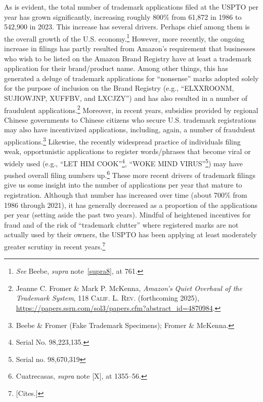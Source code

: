 \documentclass[letterpaper, 11pt, oneside]{article}
\begin{document}
As is evident, the total number of trademark applications filed at the USPTO per year has grown significantly, increasing roughly 800\% from 61,872 in 1986 to 542,900 in 2023. This increase has several drivers. Perhaps chief among them is the overall growth of the U.S. economy.\footnote{\textit{See} Beebe, \textit{supra} note~\ref{supra8}, at 761.} However, more recently, the ongoing increase in filings has partly resulted from Amazon's requirement that businesses who wish to be listed on the Amazon Brand Registry have at least a trademark application for their brand/product name. Among other things, this has generated a deluge of trademark applications for ``nonsense'' marks adopted solely for the purpose of inclusion on the Brand Registry (e.g., ``ELXXROONM, SUJIOWJNP, XUFFBV, and LXCJZY'') and has also resulted in a number of fraudulent applications.\footnote{Jeanne C. Fromer \& Mark P. McKenna, \textit{Amazon's Quiet Overhaul of the Trademark System}, 118 \textsc{Calif. L. Rev.} (forthcoming 2025), \url{https://papers.ssrn.com/sol3/papers.cfm?abstract_id=4870984}.} Moreover, in recent years, subsidies provided by regional Chinese governments to Chinese citizens who secure U.S. trademark registrations may also have incentivized applications, including, again, a number of fraudulent applications.\footnote{Beebe \& Fromer (Fake Trademark Specimens); Fromer \& McKenna.} Likewise, the recently widespread practice of individuals filing weak, opportunistic applications to register words/phrases that become viral or widely used (e.g., ``LET HIM COOK''\footnote{Serial No. 98,223,135.}, ``WOKE MIND VIRUS''\footnote{Serial no. 98,670,319}) may have pushed overall filing numbers up.\footnote{Cuatrecasas, \textit{supra} note [X], at 1355–56.} These more recent drivers of trademark filings give us some insight into the number of applications per year that mature to registration. Although that number has increased over time (about 700\% from 1986 through 2021), it has generally decreased as a proportion of the applications per year (setting aside the past two years). Mindful of heightened incentives for fraud and of the risk of  ``trademark clutter'' where registered marks are not actually used by their owners, the USPTO has been applying at least moderately greater scrutiny in recent years.\footnote{[Cites.]}
\end{document}
